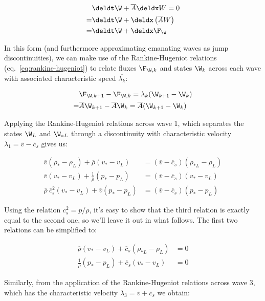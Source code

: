 \begin{align}
 &\deldt \W + \overline{A} \deldx W = 0 \\
= &\deldt \W + \deldx \left(\overline{A}  W \right)  \\
= &\deldt \W + \deldx \F_{\W}
\end{align}


In this form (and furthermore approximating emanating waves as jump discontinuities), we can make 
use of the Rankine-Hugeniot relations (eq.~\ref{eq:rankine-hugeniot}) to relate fluxes $\F_{\W, k}$ 
and states $\W_k$ across each wave with associated characteristic speed $\overline{\lambda_k}$:

\begin{align}
    & \F_{\W, k + 1} - \F_{\W, k} = \lambda_k (\W_{k+1} - \W_k) \\
    = & \overline{A} \W_{k+1} - \overline{A} \W_k = \overline{A} (\W_{k+1} - \W_k) 
\end{align}

Applying the Rankine-Hugeniot relations across wave 1, which separates the states $\W_L$ and 
$\W_{*L}$ through a discontinuity with characteristic velocity $\overline{\lambda_1} = \overline{v} 
- \overline{c}_s$ gives us:

\begin{align*}
    \overline{v} (\rho_* - \rho_L)  + \overline{\rho} (v_* - v_L) &= 
        (\overline{v} - \overline{c}_s) (\rho_{*L} - \rho_L) \\
    \overline{v} (v_* - v_L) + \frac{1}{\overline{\rho}} (p_* - p_L) &= 
        (\overline{v} - \overline{c}_s) (v_* - v_L) \\
    \overline{\rho} \ \overline{c}_s^2 (v_* - v_L) + \overline{v} (p_* - p_L) &=
        (\overline{v} - \overline{c}_s) (p_* - p_L)
\end{align*}

Using the relation $c_s^2 = p / \rho$, it's easy to show that the third relation is exactly equal 
to the second one, so we'll leave it out in what follows. The first two relations can be simplified 
to:

\begin{align}
    \overline{\rho} (v_* - v_L) + \overline{c}_s (\rho_{*L} - \rho_L) &= 0 \label{eq:app-PV1}\\
    \frac{1}{\overline{\rho}} (p_* - p_L) + \overline{c}_s (v_* - v_L) &= 0 \label{eq:app-PV2}
\end{align}

Similarly, from the application of the Rankine-Hugeniot relations across wave 3, which has the 
characteristic velocity $\overline{\lambda}_3 = \overline{v} + \overline{c}_s$ we obtain:

